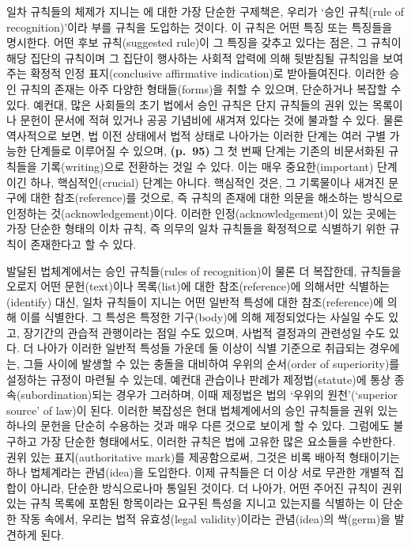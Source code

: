 일차 규칙들의 체제가 지니는 에 대한 가장
단순한 구제책은, 우리가 ‘승인 규칙(rule of recognition)’이라 부를 규칙을
도입하는 것이다. 이 규칙은 어떤 특징 또는 특징들을 명시한다. 어떤 후보
규칙(suggested rule)이 그 특징을 갖추고 있다는 점은, 그 규칙이 해당
집단의 규칙이며 그 집단이 행사하는 사회적 압력에 의해 뒷받침될 규칙임을
보여 주는 확정적 인정 표지(conclusive affirmative indication)로
받아들여진다. 이러한 승인 규칙의 존재는 아주 다양한 형태들(forms)을 취할
수 있으며, 단순하거나 복잡할 수 있다. 예컨대, 많은 사회들의 초기 법에서
승인 규칙은 단지 규칙들의 권위 있는 목록이나 문헌이 문서에 적혀 있거나
공공 기념비에 새겨져 있다는 것에 불과할 수 있다. 물론 역사적으로 보면,
법 이전 상태에서 법적 상태로 나아가는 이러한 단계는 여러 구별 가능한
단계들로 이루어질 수 있으며, \textbf{(p.~95)} 그 첫 번째 단계는 기존의
비문서화된 규칙들을 기록(writing)으로 전환하는 것일 수 있다. 이는 매우
중요한(important) 단계이긴 하나, 핵심적인(crucial) 단계는 아니다.
핵심적인 것은, 그 기록물이나 새겨진 문구에 대한 참조(reference)를
 것으로, 즉 규칙의 존재에 대한 의문을
해소하는  방식으로 인정하는
것(acknowledgement)이다. 이러한 인정(acknowledgement)이 있는 곳에는 가장
단순한 형태의 이차 규칙, 즉 의무의 일차 규칙들을 확정적으로 식별하기
위한 규칙이 존재한다고 할 수 있다.

발달된 법체계에서는 승인 규칙들(rules of recognition)이 물론 더
복잡한데, 규칙들을 오로지 어떤 문헌(text)이나 목록(list)에 대한
참조(reference)에 의해서만 식별하는(identify) 대신, 일차 규칙들이 지니는
어떤 일반적 특성에 대한 참조(reference)에 의해 이를 식별한다. 그 특성은
특정한 기구(body)에 의해 제정되었다는 사실일 수도 있고, 장기간의 관습적
관행이라는 점일 수도 있으며, 사법적 결정과의 관련성일 수도 있다. 더
나아가 이러한 일반적 특성들 가운데 둘 이상이 식별 기준으로 취급되는
경우에는, 그들 사이에 발생할 수 있는 충돌을 대비하여 우위의 순서(order
of superiority)를 설정하는 규정이 마련될 수 있는데, 예컨대 관습이나
판례가 제정법(statute)에 통상 종속(subordination)되는 경우가 그러하며,
이때 제정법은 법의 ‘우위의 원천’(`superior source' of law)이 된다.
이러한 복잡성은 현대 법체계에서의 승인 규칙들을 권위 있는 하나의 문헌을
단순히 수용하는 것과 매우 다른 것으로 보이게 할 수 있다. 그럼에도
불구하고 가장 단순한 형태에서도, 이러한 규칙은 법에 고유한 많은 요소들을
수반한다. 권위 있는 표지(authoritative mark)를 제공함으로써, 그것은 비록
배아적 형태이기는 하나 법체계라는 관념(idea)을 도입한다. 이제 규칙들은
더 이상 서로 무관한 개별적 집합이 아니라, 단순한 방식으로나마 통일된
것이다. 더 나아가, 어떤 주어진 규칙이 권위 있는 규칙 목록에 포함된
항목이라는 요구된 특성을 지니고 있는지를 식별하는 이 단순한 작동 속에서,
우리는 법적 유효성(legal validity)이라는 관념(idea)의 싹(germ)을
발견하게 된다.

